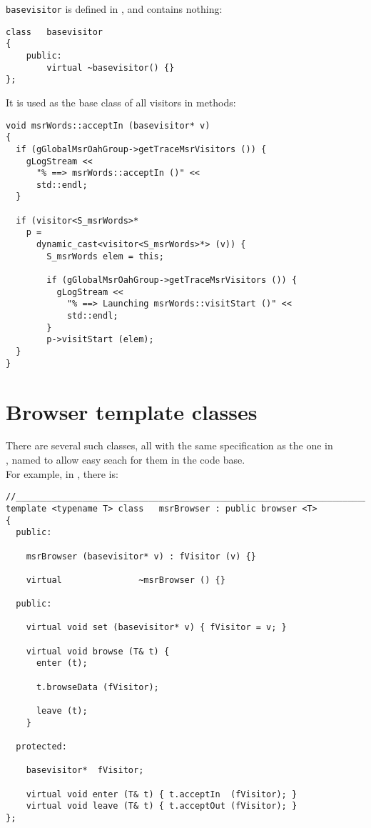 {\tt basevisitor} is defined in , and contains nothing:
\begin{lstlisting}[language=CPlusPlus]
class   basevisitor
{
	public:
		virtual ~basevisitor() {}
};
\end{lstlisting}

It is used as the base class   of all visitors in  methods:
\begin{lstlisting}[language=CPlusPlus]
void msrWords::acceptIn (basevisitor* v)
{
  if (gGlobalMsrOahGroup->getTraceMsrVisitors ()) {
    gLogStream <<
      "% ==> msrWords::acceptIn ()" <<
      std::endl;
  }

  if (visitor<S_msrWords>*
    p =
      dynamic_cast<visitor<S_msrWords>*> (v)) {
        S_msrWords elem = this;

        if (gGlobalMsrOahGroup->getTraceMsrVisitors ()) {
          gLogStream <<
            "% ==> Launching msrWords::visitStart ()" <<
            std::endl;
        }
        p->visitStart (elem);
  }
}
\end{lstlisting}


\section{Browser template classes}

There are several such classes, all with the same specification as the one in\\
, named to allow easy seach for them in the code base.\\
For example, in , there is:
\begin{lstlisting}[language=CPlusPlus]
//______________________________________________________________________________
template <typename T> class   msrBrowser : public browser <T>
{
  public:

    msrBrowser (basevisitor* v) : fVisitor (v) {}

    virtual               ~msrBrowser () {}

  public:

    virtual void set (basevisitor* v) { fVisitor = v; }

    virtual void browse (T& t) {
      enter (t);

      t.browseData (fVisitor);

      leave (t);
    }

  protected:

    basevisitor*  fVisitor;

    virtual void enter (T& t) { t.acceptIn  (fVisitor); }
    virtual void leave (T& t) { t.acceptOut (fVisitor); }
};
\end{lstlisting}


